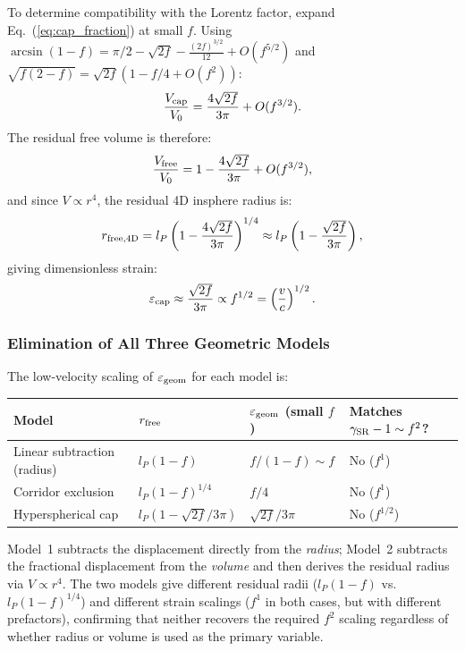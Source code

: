 \documentclass[11pt,letterpaper]{article}
\begin{document}
To determine compatibility with the Lorentz factor, expand 
Eq.~(\ref{eq:cap_fraction}) at small $f$. Using 
$\arcsin(1-f) = \pi/2 - \sqrt{2f} - \frac{(2f)^{3/2}}{12} + O(f^{5/2})$ and $\sqrt{f(2-f)} = \sqrt{2f}(1 - f/4 + O(f^2))$:
\begin{equation}
\frac{V_{\rm cap}}{V_0} = \frac{4\sqrt{2f}}{3\pi} + O(f^{3/2}).
\label{eq:cap_small_f}
\end{equation}
The residual free volume is therefore:
\begin{equation}
\frac{V_{\rm free}}{V_0} = 1 - \frac{4\sqrt{2f}}{3\pi} + O(f^{3/2}),
\label{eq:Vfree_cap}
\end{equation}
and since $V \propto r^4$, the residual 4D insphere radius is:
\begin{equation}
r_{\rm free,4D} = l_P\left(1 - \frac{4\sqrt{2f}}{3\pi}\right)^{1/4} 
\approx l_P\left(1 - \frac{\sqrt{2f}}{3\pi}\right),
\label{eq:rfree_cap}
\end{equation}
giving dimensionless strain:
\begin{equation}
\varepsilon_{\rm cap} \approx \frac{\sqrt{2f}}{3\pi} 
\propto f^{1/2} = \left(\frac{v}{c}\right)^{1/2}.
\label{eq:strain_cap}
\end{equation}

\subsubsection{Elimination of All Three Geometric Models}

The low-velocity scaling of $\varepsilon_{\rm geom}$ for each model is:

\begin{center}
\begin{tabular}{llll}
\toprule
Model & $r_{\rm free}$ & $\varepsilon_{\rm geom}$ (small $f$) & 
Matches $\gamma_{\rm SR}-1 \sim f^2$? \\
\midrule
Linear subtraction (radius) & $l_P(1-f)$ & $f/(1-f) \sim f$ & No ($f^1$) \\
Corridor exclusion & $l_P(1-f)^{1/4}$ & $f/4$ & No ($f^1$) \\
Hyperspherical cap & $l_P(1-\sqrt{2f}/3\pi)$ & 
$\sqrt{2f}/3\pi$ & No ($f^{1/2}$) \\
\bottomrule
\end{tabular}
\end{center}

Model~1 subtracts the displacement directly from the \emph{radius}; 
Model~2 subtracts the fractional displacement from the \emph{volume} 
and then derives the residual radius via $V \propto r^4$. The two 
models give different residual radii ($l_P(1-f)$ vs.\ $l_P(1-f)^{1/4}$) 
and different strain scalings ($f^1$ in both cases, but with different 
prefactors), confirming that neither recovers the required $f^2$ scaling 
regardless of whether radius or volume is used as the primary variable.
\end{document}
